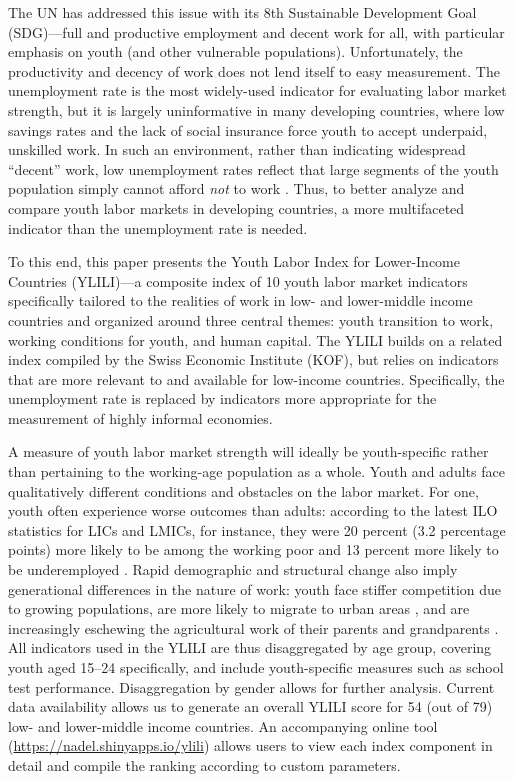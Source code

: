 \documentclass[
  a4paper, twoside, 12pt]{book}
\begin{document}
The UN has addressed this issue with its 8th Sustainable Development Goal (SDG)---full and productive employment and decent work for all, with particular emphasis on youth (and other vulnerable populations). Unfortunately, the productivity and decency of work does not lend itself to easy measurement. The unemployment rate is the most widely-used indicator for evaluating labor market strength, but it is largely uninformative in many developing countries, where low savings rates and the lack of social insurance force youth to accept underpaid, unskilled work. In such an environment, rather than indicating widespread ``decent'' work, low unemployment rates reflect that large segments of the youth population simply cannot afford \emph{not} to work \autocite{zimmermann2013,dewan2007}. Thus, to better analyze and compare youth labor markets in developing countries, a more multifaceted indicator than the unemployment rate is needed.

To this end, this paper presents the Youth Labor Index for Lower-Income Countries (YLILI)---a composite index of 10 youth labor market indicators specifically tailored to the realities of work in low- and lower-middle income countries and organized around three central themes: youth transition to work, working conditions for youth, and human capital. The YLILI builds on a related index compiled by the Swiss Economic Institute (KOF), but relies on indicators that are more relevant to and available for low-income countries. Specifically, the unemployment rate is replaced by indicators more appropriate for the measurement of highly informal economies.

A measure of youth labor market strength will ideally be youth-specific rather than pertaining to the working-age population as a whole. Youth and adults face qualitatively different conditions and obstacles on the labor market. For one, youth often experience worse outcomes than adults: according to the latest ILO statistics for LICs and LMICs, for instance, they were 20 percent (3.2 percentage points) more likely to be among the working poor and 13 percent more likely to be underemployed \autocite{ilo2023b}. Rapid demographic and structural change also imply generational differences in the nature of work: youth face stiffer competition due to growing populations, are more likely to migrate to urban areas \autocite{debrauw2014}, and are increasingly eschewing the agricultural work of their parents and grandparents \autocite{honorati2016}. All indicators used in the YLILI are thus disaggregated by age group, covering youth aged 15--24 specifically, and include youth-specific measures such as school test performance. Disaggregation by gender allows for further analysis. Current data availability allows us to generate an overall YLILI score for 54 (out of 79) low- and lower-middle income countries. An accompanying online tool (\url{https://nadel.shinyapps.io/ylili}) allows users to view each index component in detail and compile the ranking according to custom parameters.
\end{document}
